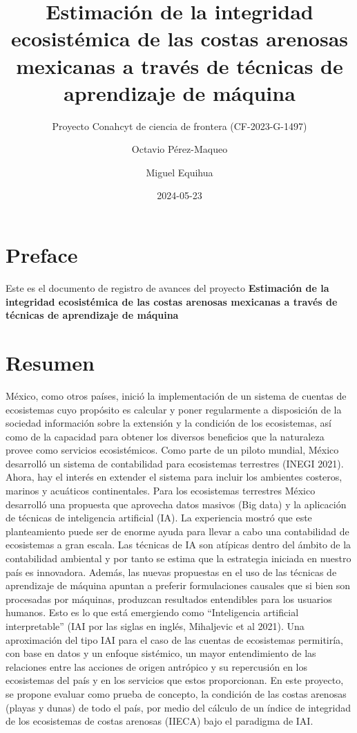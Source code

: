 \documentclass[
  letterpaper,
  DIV=11,
  numbers=noendperiod]{scrreprt}
\title{Estimación de la integridad ecosistémica de las costas arenosas
mexicanas a través de técnicas de aprendizaje de máquina}
\subtitle{Proyecto Conahcyt de ciencia de frontera (CF-2023-G-1497)}
\author{Octavio Pérez-Maqueo \and Miguel Equihua}
\date{2024-05-23}
\renewcommand*\contentsname{Tabla de contenidos}
\newcommand\contentsname{Tabla de contenidos}
\begin{document}
\maketitle

\renewcommand*\contentsname{Tabla de contenidos}
{
\hypersetup{linkcolor=}
\setcounter{tocdepth}{2}
\tableofcontents
}

\chapter*{Preface}\label{preface}


Este es el documento de registro de avances del proyecto
\textbf{Estimación de la integridad ecosistémica de las costas arenosas
mexicanas a través de técnicas de aprendizaje de máquina}


\chapter{Resumen}\label{resumen}

México, como otros países, inició la implementación de un sistema de
cuentas de ecosistemas cuyo propósito es calcular y poner regularmente a
disposición de la sociedad información sobre la extensión y la condición
de los ecosistemas, así como de la capacidad para obtener los diversos
beneficios que la naturaleza provee como servicios ecosistémicos. Como
parte de un piloto mundial, México desarrolló un sistema de contabilidad
para ecosistemas terrestres (INEGI 2021). Ahora, hay el interés en
extender el sistema para incluir los ambientes costeros, marinos y
acuáticos continentales. Para los ecosistemas terrestres México
desarrolló una propuesta que aprovecha datos masivos (Big data) y la
aplicación de técnicas de inteligencia artificial (IA). La experiencia
mostró que este planteamiento puede ser de enorme ayuda para llevar a
cabo una contabilidad de ecosistemas a gran escala. Las técnicas de IA
son atípicas dentro del ámbito de la contabilidad ambiental y por tanto
se estima que la estrategia iniciada en nuestro país es innovadora.
Además, las nuevas propuestas en el uso de las técnicas de aprendizaje
de máquina apuntan a preferir formulaciones causales que si bien son
procesadas por máquinas, produzcan resultados entendibles para los
usuarios humanos. Esto es lo que está emergiendo como ``Inteligencia
artificial interpretable'' (IAI por las siglas en inglés, Mihaljevic et
al 2021). Una aproximación del tipo IAI para el caso de las cuentas de
ecosistemas permitiría, con base en datos y un enfoque sistémico, un
mayor entendimiento de las relaciones entre las acciones de origen
antrópico y su repercusión en los ecosistemas del país y en los
servicios que estos proporcionan. En este proyecto, se propone evaluar
como prueba de concepto, la condición de las costas arenosas (playas y
dunas) de todo el país, por medio del cálculo de un índice de integridad
de los ecosistemas de costas arenosas (IIECA) bajo el paradigma de IAI.
\end{document}
